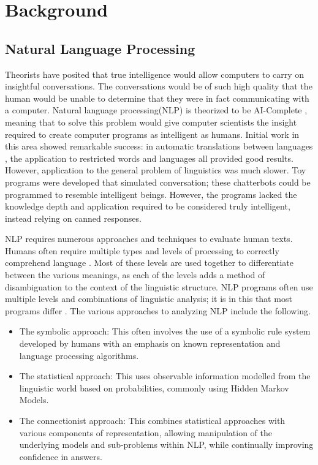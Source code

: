 \chapter{Background} 

\section{Natural Language Processing}

Theorists have posited that true intelligence would allow computers to carry 
on insightful conversations. The conversations would be of
such high quality that the human would be unable to determine that they were in
fact communicating with a computer\cite{TURING_TEST}.  Natural language
processing(NLP) is theorized to be AI-Complete \cite{AICOMPLETE}, meaning that
to solve this problem would give computer scientists the insight required to
create computer programs as intelligent as humans.  Initial work in this area
showed remarkable success: in automatic translations between languages
\cite{EN_RUS}, the application to restricted words and
languages\cite{AI_MODERN} all provided good results.  However, application to
the general problem of linguistics was much slower.  Toy programs were developed
that simulated conversation; these chatterbots could be programmed to resemble
intelligent beings.  However, the programs lacked the knowledge depth and
application required to be considered truly intelligent, instead relying on
canned responses.   

NLP requires numerous approaches and techniques to
evaluate human texts. Humans often require multiple types and levels of
processing to correctly comprehend language \cite{NLPENCY}. Most of these levels
are used together to differentiate between the various meanings, as each of the
levels adds a method of disambiguation to the context of the linguistic
structure.  NLP programs often use multiple levels and combinations of
linguistic analysis; it is in this that most programs differ \cite{NLPENCY}.
The various approaches to analyzing NLP include the following. \begin{itemize}
\item The symbolic approach: This often involves the use of a symbolic rule
system developed by humans with an emphasis on known representation and language
processing algorithms.     \item The statistical approach: This uses observable
information modelled from the linguistic world based on probabilities, commonly
using Hidden Markov Models.     \item The connectionist approach: This combines
statistical approaches with various components of representation, allowing
manipulation of the underlying models and sub-problems within NLP, while
continually improving confidence in answers. \end{itemize} 

